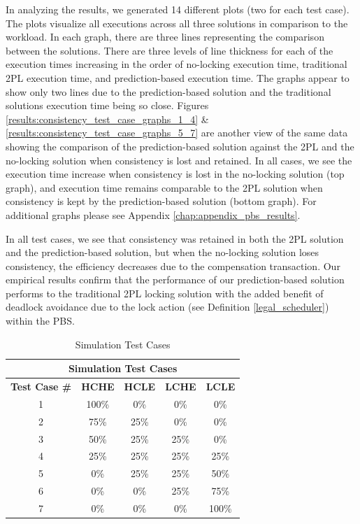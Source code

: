 In analyzing the results, we generated 14 different plots (two for each test case). The plots visualize all executions across all three solutions in comparison to the workload. In each graph, there are three lines representing the comparison between the solutions. There are three levels of line thickness for each of the execution times increasing in the order of no-locking execution time, traditional \ac{2PL} execution time, and prediction-based execution time. The graphs appear to show only two lines due to the prediction-based solution and the traditional solutions execution time being so close. Figures \ref{results:consistency_test_case_graphs_1_4} \& \ref{results:consistency_test_case_graphs_5_7} are another view of the same data showing the comparison of the prediction-based solution against the \ac{2PL} and the no-locking solution when consistency is lost and retained. In all cases, we see the execution time increase when consistency is lost in the no-locking solution (top graph), and execution time remains comparable to the \ac{2PL} solution when consistency is kept by the prediction-based solution (bottom graph). For additional graphs please see Appendix \ref{chap:appendix_pbs_results}.

In all test cases, we see that consistency was retained in both the \ac{2PL} solution and the prediction-based solution, but when the no-locking solution loses consistency, the efficiency decreases due to the compensation transaction. Our empirical results confirm that the performance of our prediction-based solution performs to the traditional \ac{2PL} locking solution with the added benefit of deadlock avoidance due to the lock action (see Definition \ref{legal_scheduler}) within the \ac{PBS}.

\begin{table}[h]
\caption{Simulation Test Cases} %
\captionsetup{justification=centering}
\centering
\begin{tabular}{|c|c|c|c|c|}
\hline
\multicolumn{5}{|c|}{\cellcolor[HTML]{EFEFEF}\textbf{Simulation Test Cases}}                                                   \\ \hline
\textbf{Test Case \#} & \textbf{HCHE} & \textbf{HCLE} & \textbf{LCHE} & \textbf{LCLE} \\ \hline
1 & 100\% & 0\% & 0\% & 0\% \\ \hline
2 & 75\% & 25\% & 0\% & 0\% \\ \hline
3 & 50\% & 25\% & 25\% & 0\% \\ \hline
4 & 25\% & 25\% & 25\% & 25\% \\ \hline
5 & 0\% & 25\% & 25\% & 50\% \\ \hline
6 & 0\% & 0\% & 25\% & 75\% \\ \hline
7 & 0\% & 0\% & 0\% & 100\% \\ \hline
\end{tabular}

\label{tbl:sim_test_cases} %

\end{table}

